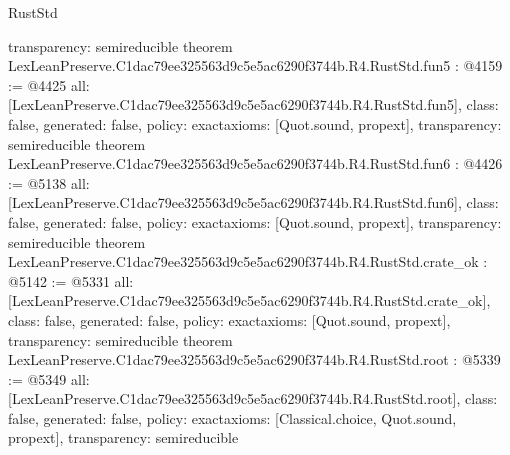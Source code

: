 \begin{lexlean}{RustStd}
\begin{coremodule}
{  transparency: semireducible
}
theorem LexLeanPreserve.C1dac79ee325563d9c5e5ac6290f3744b.R4.RustStd.fun5 : @4159 := @4425 {
  all: [LexLeanPreserve.C1dac79ee325563d9c5e5ac6290f3744b.R4.RustStd.fun5],
  class: false,
  generated: false,
  policy: exact{axioms: [Quot.sound, propext]},
  transparency: semireducible
}
theorem LexLeanPreserve.C1dac79ee325563d9c5e5ac6290f3744b.R4.RustStd.fun6 : @4426 := @5138 {
  all: [LexLeanPreserve.C1dac79ee325563d9c5e5ac6290f3744b.R4.RustStd.fun6],
  class: false,
  generated: false,
  policy: exact{axioms: [Quot.sound, propext]},
  transparency: semireducible
}
theorem LexLeanPreserve.C1dac79ee325563d9c5e5ac6290f3744b.R4.RustStd.crate_ok : @5142 := @5331 {
  all: [LexLeanPreserve.C1dac79ee325563d9c5e5ac6290f3744b.R4.RustStd.crate_ok],
  class: false,
  generated: false,
  policy: exact{axioms: [Quot.sound, propext]},
  transparency: semireducible
}
theorem LexLeanPreserve.C1dac79ee325563d9c5e5ac6290f3744b.R4.RustStd.root : @5339 := @5349 {
  all: [LexLeanPreserve.C1dac79ee325563d9c5e5ac6290f3744b.R4.RustStd.root],
  class: false,
  generated: false,
  policy: exact{axioms: [Classical.choice, Quot.sound, propext]},
  transparency: semireducible
}


\end{coremodule}
\end{lexlean}
